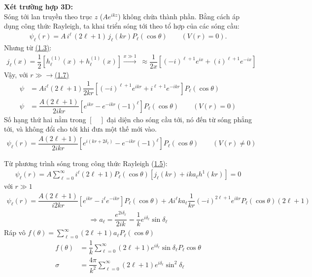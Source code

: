 \documentclass{report}
\renewcommand{\l}{\ell}
\newcommand{\f}[2]{\dfrac{#1}{#2}}
\begin{document}
	\textbf{Xét trường hợp 3D:}\\
	Sóng tới lan truyền theo trục $z$ ($Ae^{ikz}$) không chứa thành phần. Bằng cách áp dụng công thức Rayleigh, ta khai triển sóng tới theo tổ hợp của các sóng cầu:
	\begin{align}
		\psi_{\l}(r) = A\,i^{\l}\,(2\l+1)\,j_{\l} (kr)P_{\l} (\cos\theta) \quad \quad (V(r) = 0).
	\end{align}
	Nhưng từ \hyperref[eq1.3]{(1.3)}:
	\begin{align}
		j_{\l}(x) = \f{1}{2} \left[ h_{\l}^{(1)}(x) + h_{\l}^{(1)}(x)  \right] \overset{x\gg1}{\longrightarrow}\; \approx \f{1}{2x}\left[ (-i)^{\l+1}e^{ix} + (i)^{\l+1}e^{-ix} \right]
	\end{align}\label{eq1.7}
	Vậy, với $r\gg$$\rightarrow$\hyperref[eq1.7]{(1.7)}
\begin{align}
	\psi & = Ai^{\l} (2\l+1) \f{1}{2kr}\left[(-i)^{\l+1} e^{ikr} +i^{\l+1}e^{-ikr} \right]P_{\l}(\cos\theta)\nonumber\\
	\psi & = \f{A(2\l + 1)}{2ikr}\left[e^{ikr} - e^{-ikr}(-1)^{\l} \right]P_{\l}(\cos\theta) \quad \quad (V(r) = 0)
\end{align}
Số hạng thứ hai nằm trong $[\quad]$ đại diện cho sóng cầu tới, nó đến từ sóng phẳng tới, và không đổi cho tới khi đưa một thế mới vào.
\begin{align}
	\psi_{\l}(r) = \f{A(2\l + 1)}{2ikr}\left[e^{i(kr+2\delta_{\l})} - e^{-ikr}(-1)^{\l} \right]P_{\l}(\cos\theta) \quad \quad (V(r) \neq 0)
\end{align}

Từ phương trình sóng trong công thức Rayleigh (\hyperref[eq1.5]{1.5}):
\begin{align*}
	\psi_{\l}(r) = A\sum_{\l=0}^{\infty}i^{\l}(2\l+1)P_{\l}(\cos\theta)\left[ j_{\l} (kr)+ika_{\l}h^{1}(kr) \right] = 0
\end{align*}
với $r\gg1$
\begin{align*}
	\psi_{\l}(r) = \f{A(2\l+1)}{i2kr}\left[e^{ikr} - i^{\l} e^{-ikr} \right] P_{\l}(\cos\theta) + A i^{\l}ka_{\l}\f{1}{kr}(-i)^{2\l+1}e^{ikr}P_{\l}(\cos\theta)(2\l+1)
\end{align*}
\begin{align}
	\Rightarrow a_{\l} = \f{e^{2i\delta_{\l}}}{2ik} = \f{1}{k}e^{i\delta_{\l}}\sin\delta_{\l}
\end{align}
Ráp vô $f(\theta)  = \sum_{\l=0}^{\infty}(2\l+1)a_{\l} P_{\l}(\cos\theta)$
\begin{align}
	f(\theta) &= \f{1}{k} \sum_{\l = 0}^{\infty}(2\l + 1)e^{i\delta_{\l}}\sin\delta_{\l} P_{\l}\cos\theta\\
	\sigma &= \f{4\pi}{k^2} \sum_{\l = 0}^{\infty}(2\l + 1)e^{i\delta_{\l}}\sin^{2}\delta_{\l}
\end{align}
\end{document}
